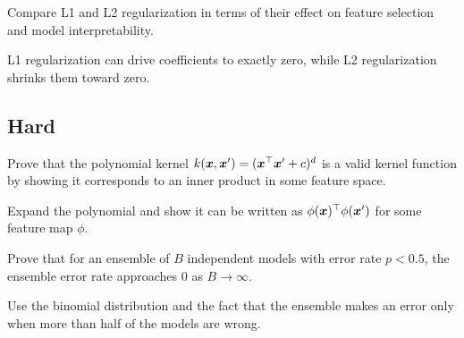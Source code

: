 \begin{exercisebox}[medium]
\begin{problem}
\label{prob:regularization-effects}
Compare L1 and L2 regularization in terms of their effect on feature selection and model interpretability.
\end{problem}
\begin{hintbox}
L1 regularization can drive coefficients to exactly zero, while L2 regularization shrinks them toward zero.
\end{hintbox}
\end{exercisebox}


\subsection*{Hard}

\begin{exercisebox}[hard]
\begin{problem}
\label{prob:svm-kernel-trick}
Prove that the polynomial kernel $k(\boldsymbol{x}, \boldsymbol{x}') = (\boldsymbol{x}^\top \boldsymbol{x}' + c)^d$ is a valid kernel function by showing it corresponds to an inner product in some feature space.
\end{problem}
\begin{hintbox}
Expand the polynomial and show it can be written as $\phi(\boldsymbol{x})^\top \phi(\boldsymbol{x}')$ for some feature map $\phi$.
\end{hintbox}
\end{exercisebox}


\begin{exercisebox}[hard]
\begin{problem}
\label{prob:ensemble-theory}
Prove that for an ensemble of $B$ independent models with error rate $p < 0.5$, the ensemble error rate approaches 0 as $B \to \infty$.
\end{problem}
\begin{hintbox}
Use the binomial distribution and the fact that the ensemble makes an error only when more than half of the models are wrong.
\end{hintbox}
\end{exercisebox}

